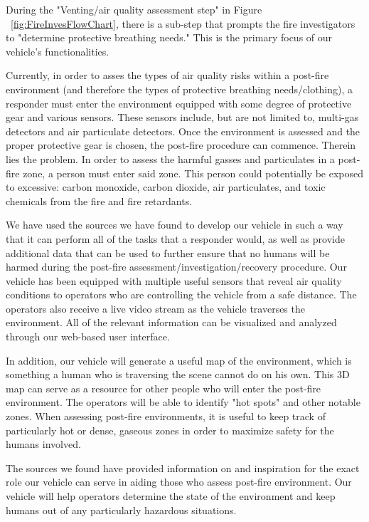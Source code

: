 During the "Venting/air quality assessment step" in Figure ~\ref{fig:FireInvesFlowChart}, there is a sub-step that prompts the fire investigators to "determine protective breathing needs."\cite{nfpa} This is the primary focus of our vehicle's functionalities.

Currently, in order to asses the types of air quality risks within a post-fire environment (and therefore the types of protective breathing needs/clothing), a responder must enter the environment equipped with some degree of protective gear and various sensors. These sensors include, but are not limited to, multi-gas detectors and air particulate detectors.\cite{evaluationofhazards} Once the environment is assessed and the proper protective gear is chosen, the post-fire procedure can commence. Therein lies the problem. In order to assess the harmful gasses and particulates in a post-fire zone, a person must enter said zone. This person could potentially be exposed to excessive: carbon monoxide, carbon dioxide, air particulates, and toxic chemicals from the fire and fire retardants. \cite{toxichazards}


We have used the sources we have found to develop our vehicle in such a way that it can perform all of the tasks that a responder would, as well as provide additional data that can be used to further ensure that no humans will be harmed during the post-fire assessment/investigation/recovery procedure. 
Our vehicle has been equipped with multiple useful sensors that reveal air quality conditions to operators who are controlling the vehicle from a safe distance. The operators also receive a live video stream as the vehicle traverses the environment. All of the relevant information can be visualized and analyzed through our web-based user interface. 

In addition, our vehicle will generate a useful map of the environment, which is something a human who is traversing the scene cannot do on his own. This 3D map can serve as a resource for other people who will enter the post-fire environment. The operators will be able to identify "hot spots" and other notable zones. When assessing post-fire environments, it is useful to keep track of particularly hot or dense, gaseous zones in order to maximize safety for the humans involved. \cite{recoveringfromwildfire}

The sources we found have provided information on and inspiration for the exact role our vehicle can serve in aiding those who assess post-fire environment. Our vehicle will help operators determine the state of the environment and keep humans out of any particularly hazardous situations. 









